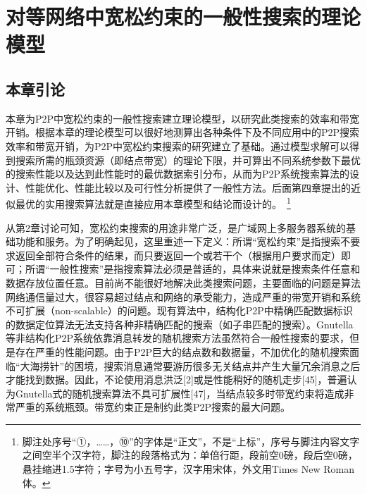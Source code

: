 \chapter{对等网络中宽松约束的一般性搜索的理论模型}
\label{chapter:03}

\section{本章引论}

本章为P2P中宽松约束的一般性搜索建立理论模型，以研究此类搜索的效率和带宽开销。根据本章的理论模型可以很好地测算出各种条件下及不同应用中的P2P搜索效率和带宽开销，为P2P中宽松约束搜索的研究建立了基础。通过模型求解可以得到搜索所需的瓶颈资源（即结点带宽）的理论下限，并可算出不同系统参数下最优的搜索性能以及达到此性能时的最优数据索引分布，从而为P2P系统搜索算法的设计、性能优化、性能比较以及可行性分析提供了一般性方法。后面第四章提出的近似最优的实用搜索算法就是直接应用本章模型和结论而设计的。~\footnote{脚注处序号“①，……，⑩”的字体是“正文”，不是“上标”，序号与脚注内容文字之间空半个汉字符，脚注的段落格式为：单倍行距，段前空0磅，段后空0磅，悬挂缩进1.5字符；字号为小五号字，汉字用宋体，外文用Times New Roman体。}

从第2章讨论可知，宽松约束搜索的用途非常广泛，是广域网上多服务器系统的基础功能和服务。为了明确起见，这里重述一下定义：所谓“宽松约束”是指搜索不要求返回全部符合条件的结果，而只要返回一个或若干个（根据用户要求而定）即可；所谓“一般性搜索”是指搜索算法必须是普适的，具体来说就是搜索条件任意和数据存放位置任意。目前尚不能很好地解决此类搜索问题，主要面临的问题是算法网络通信量过大，很容易超过结点和网络的承受能力，造成严重的带宽开销和系统不可扩展（non-scalable）的问题。现有算法中，结构化P2P中精确匹配数据标识的数据定位算法无法支持各种非精确匹配的搜索（如子串匹配的搜索）。Gnutella等非结构化P2P系统依靠消息转发的随机搜索方法虽然符合一般性搜索的要求，但是存在严重的性能问题。由于P2P巨大的结点数和数据量，不加优化的随机搜索面临“大海捞针”的困境，搜索消息通常要游历很多无关结点并产生大量冗余消息之后才能找到数据。因此，不论使用消息洪泛[2]或是性能稍好的随机走步[45]，普遍认为Gnutella式的随机搜索算法不具可扩展性[47]，当结点较多时带宽约束将造成非常严重的系统瓶颈。带宽约束正是制约此类P2P搜索的最大问题。

